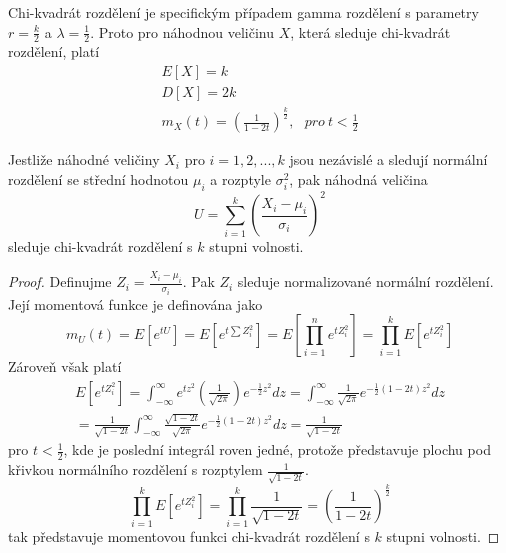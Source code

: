 \begin{corollary}
Chi-kvadrát rozdělení je specifickým případem gamma rozdělení s parametry $r = \frac{k}{2}$ a $\lambda = \frac{1}{2}$. Proto pro náhodnou veličinu $X$, která sleduje chi-kvadrát rozdělení, platí
\begin{gather*}
E[X] = k\\
D[X] = 2k\\
m_X(t) = \left(\frac{1}{1 - 2t}\right)^{\frac{k}{2}}, ~~~ \textit{pro} ~ t < \frac{1}{2}
\end{gather*}
\end{corollary}

\begin{theorem}
Jestliže náhodné veličiny $X_i$ pro $i = 1, 2, ..., k$ jsou nezávislé a sledují normální rozdělení se střední hodnotou $\mu_i$ a rozptyle $\sigma_i^2$, pak náhodná veličina
\begin{equation*}
U = \sum_{i = 1}^k \left(\frac{X_i - \mu_i}{\sigma_i}\right)^2
\end{equation*}
sleduje chi-kvadrát rozdělení s $k$ stupni volnosti.
\end{theorem}

\begin{proof}
Definujme $Z_i = \frac{X_i - \mu_i}{\sigma_i}$. Pak $Z_i$ sleduje normalizované normální rozdělení. Její momentová funkce je definována jako
\begin{equation*}
m_U(t) = E[e^{tU}] = E[e^{t \sum Z_i^2}] = E \left[\prod_{i = 1}^n e^{t Z_i^2} \right] = \prod_{i = 1}^k E \left[ e^{t Z_i^2} \right]
\end{equation*}
Zároveň však platí
\begin{gather*}
E \left[ e^{t Z_i^2} \right] = \int_{-\infty}^{\infty}e^{t z^2} \left(\frac{1}{\sqrt{2 \pi}} \right) e^{-\frac{1}{2}z^2} dz = \int_{-\infty}^{\infty} \frac{1}{\sqrt{2 \pi}} e^{-\frac{1}{2}(1 - 2t)z^2}dz\\
= \frac{1}{\sqrt{1 - 2t}} \int_{-\infty}^{\infty} \frac{\sqrt{1 - 2t}}{\sqrt{2 \pi}} e^{-\frac{1}{2}(1 - 2t)z^2}dz = \frac{1}{\sqrt{1 - 2t}}
\end{gather*}
pro $t < \frac{1}{2}$, kde je poslední integrál roven jedné, protože představuje plochu pod křivkou normálního rozdělení s rozptylem $\frac{1}{\sqrt{1 - 2t}}$.
\begin{equation*}
\prod_{i = 1}^k E \left[e^{t Z_i^2} \right] = \prod_{i = 1}^k \frac{1}{\sqrt{1 - 2t}} = \left(\frac{1}{1 - 2t}\right)^{\frac{k}{2}}
\end{equation*}
tak představuje momentovou funkci chi-kvadrát rozdělení s $k$ stupni volnosti.
\end{proof}

